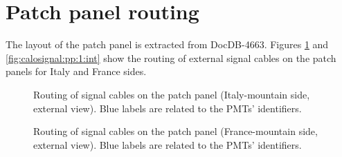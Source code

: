 
\clearpage
\section{Patch panel routing}

The layout of the patch panel is extracted from DocDB-4663.
Figures \ref{fig:calosignal:pp:0:ext} and \ref{fig:calosignal:pp:1:int}
show the routing of external signal cables
on the patch panels for Italy and France sides.

\begin{figure}[h!]
  \begin{center}
   \scalebox{1}{}
  \end{center}
  \caption{Routing of signal cables on the patch panel (Italy-mountain side, external view). Blue labels are related to the PMTs' identifiers.}
  \label{fig:calosignal:pp:0:ext}
\end{figure}



\begin{figure}[h!]
  \begin{center}
    \scalebox{1}{}
  \end{center}
  \caption{Routing of signal cables on the patch panel (France-mountain side, external view). Blue labels are related to the PMTs' identifiers.}
  \label{fig:calosignal:pp:1:ext}
\end{figure}


